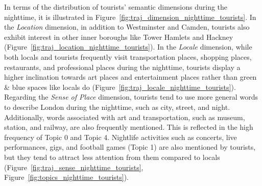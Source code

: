 \documentclass{article}
\theoremstyle{remark}
\begin{document}
In terms of the distribution of tourists' semantic dimensions during the nighttime, it is illustrated in Figure~\ref{fig:traj_dimension_nighttime_tourists}. In the \textit{Location} dimension, in addition to Westminster and Camden, tourists also exhibit interest in other inner boroughs like Tower Hamlets and Hackney (Figure~\ref{fig:traj_location_nighttime_tourists}). In the \textit{Locale} dimension, while both locals and tourists frequently visit transportation places, shopping places, restaurants, and professional places during the nighttime, tourists display a higher inclination towards art places and entertainment places rather than green \& blue spaces like locals do (Figure~\ref{fig:traj_locale_nighttime_tourists}). Regarding the \textit{Sense of Place} dimension, tourists tend to use more general words to describe London during the nighttime, such as city, street, and night. Additionally, words associated with art and transportation, such as museum, station, and railway, are also frequently mentioned. This is reflected in the high frequency of Topic 0 and Topic 4. Nightlife activities such as concerts, live performances, gigs, and football games (Topic 1) are also mentioned by tourists, but they tend to attract less attention from them compared to locals (Figure~\ref{fig:traj_sense_nighttime_tourists}, Figure~\ref{fig:topics_nighttime_tourists}).
\end{document}
